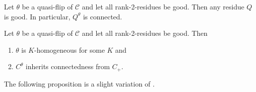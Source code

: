 \begin{prop}
	Let $\theta$ be a quasi-flip of $\mathcal{C}$ and let all rank-2-residues be good. Then any residue $Q$ is good. In particular, $Q^\theta$ is connected.
\end{prop}

\begin{prop}
	Let $\theta$ be a quasi-flip of $\mathcal{C}$ and let all rank-2-residues be good. Then
	\begin{enumerate}
		\item $\theta$ is $K$-homogeneous for some $K$ and
		\item $C^\theta$ inherits connectedness from $C_+$.
	\end{enumerate}
\end{prop}

The following proposition is a slight variation of \cite[Proposition 4.5.4]{horn:kac-moody}.

